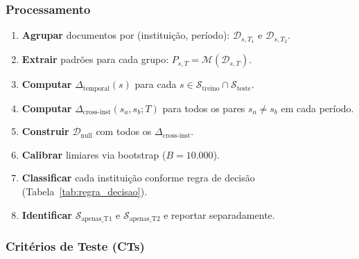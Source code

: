 \documentclass[12pt,a4paper]{article}
\theoremstyle{remark}
\begin{document}
\subsubsection{Processamento}

\begin{enumerate}[nosep]
  \item \textbf{Agrupar} documentos por (instituição, período): $\mathcal{D}_{s,T_1}$ e $\mathcal{D}_{s,T_2}$.
  \item \textbf{Extrair} padrões para cada grupo: $P_{s,T} = \mathcal{M}(\mathcal{D}_{s,T})$.
  \item \textbf{Computar} $\Delta_{\text{temporal}}(s)$ para cada $s \in \mathcal{S}_{\text{treino}} \cap \mathcal{S}_{\text{teste}}$.
  \item \textbf{Computar} $\Delta_{\text{cross-inst}}(s_a, s_b; T)$ para todos os pares $s_a \neq s_b$ em cada período.
  \item \textbf{Construir} $\mathcal{D}_{\text{null}}$ com todos os $\Delta_{\text{cross-inst}}$.
  \item \textbf{Calibrar} limiares via bootstrap ($B = 10.000$).
  \item \textbf{Classificar} cada instituição conforme regra de decisão (Tabela~\ref{tab:regra_decisao}).
  \item \textbf{Identificar} $\mathcal{S}_{\text{apenas\_T1}}$ e $\mathcal{S}_{\text{apenas\_T2}}$ e reportar separadamente.
\end{enumerate}

\subsubsection{Critérios de Teste (CTs)}
\end{document}
